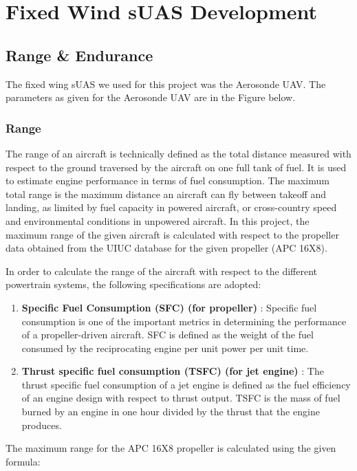 \chapter{Fixed Wind sUAS Development}
\label{chap:Fixed_Wing}

\section{Range \& Endurance}
The fixed wing sUAS we used for this project was the Aerosonde UAV. The parameters as given for the Aerosonde UAV are in the Figure below.

\subsection{Range}
The range of an aircraft is technically defined as the total distance measured with respect to the ground traversed by the aircraft on one full tank of fuel. It is used to estimate engine performance in terms of fuel consumption. The maximum total range is the maximum distance an aircraft can fly between takeoff and landing, as limited by fuel capacity in powered aircraft, or cross-country speed and environmental conditions in unpowered aircraft. In this project, the maximum range of the given aircraft is calculated with respect to the propeller data obtained from the UIUC database for the given propeller (APC 16X8).

In order to calculate the range of the aircraft with respect to the different powertrain systems, the following specifications are adopted:

\begin{enumerate}
	\item \textbf{Specific Fuel Consumption (SFC) (for propeller)} : Specific fuel consumption is one of the important metrics in determining the performance of a propeller-driven aircraft. SFC is defined as the weight of the fuel consumed by the reciprocating engine per unit power per unit time.
	
	\item \textbf{Thrust specific fuel consumption (TSFC) (for jet engine)} : The thrust specific fuel consumption of a jet engine is defined as the fuel efficiency of an engine design with respect to thrust output. TSFC is the mass of fuel burned by an engine in one hour divided by the thrust that the engine produces.
\end{enumerate}

The maximum range for the APC 16X8 propeller is calculated using the given formula: 

